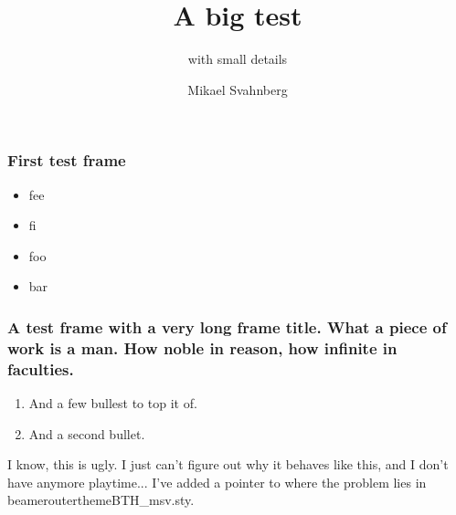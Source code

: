 \documentclass[10pt]{beamer}
\title[]{A big test}
\subtitle{with small details}
\date[]{}
\author[Mikael Svahnberg]{Mikael Svahnberg\inst{1}}
\institute[BTH] %
{
  \inst{1}%
 Mikael.Svahnberg@bth.se\\
 School of Computing\\
 Blekinge Institute of Technology%
}
\begin{document}
\begin{frame}
  \titlepage
\end{frame}



\begin{frame}[t]
\frametitle{First test frame}

\begin{itemize}
\item fee
\item fi
\item foo
\item bar
\end{itemize}

\end{frame}

\begin{frame}[t]
\frametitle{A test frame with a very long frame title. What a piece of work is a man. How noble in reason, how infinite in faculties.}

\begin{enumerate}
\item And a few bullest to top it of.
\item And a second bullet.
\end{enumerate}

I know, this is ugly. I just can't figure out why it behaves like this, and I don't have anymore playtime... I've added a pointer to where the problem lies in beamerouterthemeBTH\_msv.sty.

\end{frame}





%    
%    

%     

\end{document}
